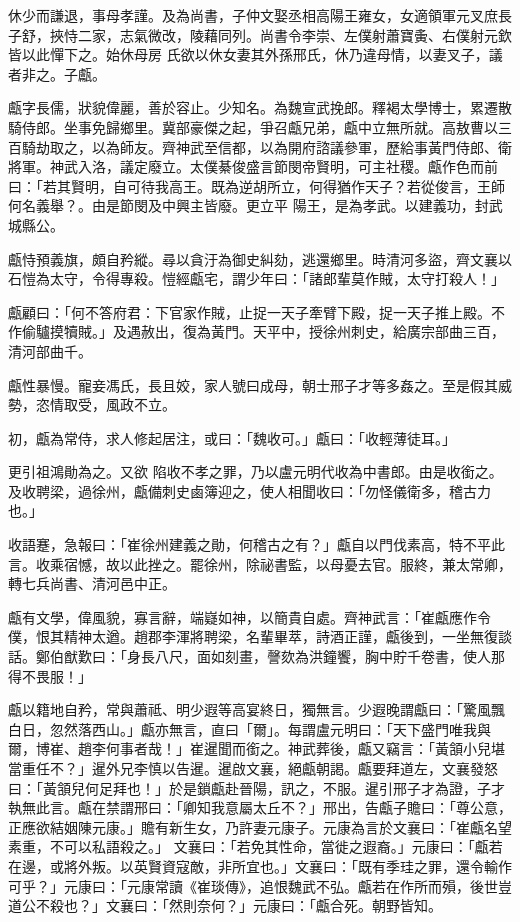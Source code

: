 \begin{pinyinscope}
 休少而謙退，事母孝謹。及為尚書，子仲文娶丞相高陽王雍女，女適領軍元叉庶長子舒，挾恃二家，志氣微改，陵藉同列。尚書令李崇、左僕射蕭寶夤、右僕射元欽皆以此憚下之。始休母房
 氏欲以休女妻其外孫邢氏，休乃違母情，以妻叉子，議者非之。子甗。



 甗字長儒，狀貌偉麗，善於容止。少知名。為魏宣武挽郎。釋褐太學博士，累遷散騎侍郎。坐事免歸鄉里。冀部豪傑之起，爭召甗兄弟，甗中立無所就。高敖曹以三百騎劫取之，以為師友。齊神武至信都，以為開府諮議參軍，歷給事黃門侍郎、衛將軍。神武入洛，議定廢立。太僕綦俊盛言節閔帝賢明，可主社稷。甗作色而前曰：「若其賢明，自可待我高王。既為逆胡所立，何得猶作天子？若從俊言，王師何名義舉？。由是節閔及中興主皆廢。更立平
 陽王，是為孝武。以建義功，封武城縣公。



 甗恃預義旗，頗自矜縱。尋以貪汙為御史糾劾，逃還鄉里。時清河多盜，齊文襄以石愷為太守，令得專殺。愷經甗宅，謂少年曰：「諸郎輩莫作賊，太守打殺人！」



 甗顧曰：「何不答府君：下官家作賊，止捉一天子牽臂下殿，捉一天子推上殿。不作偷驢摸犢賊。」及遇赦出，復為黃門。天平中，授徐州刺史，給廣宗部曲三百，清河部曲千。



 甗性暴慢。寵妾馮氏，長且姣，家人號曰成母，朝士邢子才等多姦之。至是假其威勢，恣情取受，風政不立。



 初，甗為常侍，求人修起居注，或曰：「魏收可。」甗曰：「收輕薄徒耳。」



 更引祖鴻勛為之。又欲
 陷收不孝之罪，乃以盧元明代收為中書郎。由是收銜之。及收聘梁，過徐州，甗備刺史鹵簿迎之，使人相聞收曰：「勿怪儀衛多，稽古力也。」



 收語蹇，急報曰：「崔徐州建義之勛，何稽古之有？」甗自以門伐素高，特不平此言。收乘宿憾，故以此挫之。罷徐州，除祕書監，以母憂去官。服終，兼太常卿，轉七兵尚書、清河邑中正。



 甗有文學，偉風貌，寡言辭，端嶷如神，以簡貴自處。齊神武言：「崔甗應作令僕，恨其精神太遒。趙郡李渾將聘梁，名輩畢萃，詩酒正謹，甗後到，一坐無復談話。鄭伯猷歎曰：「身長八尺，面如刻畫，謦欬為洪鐘饗，胸中貯千卷書，使人那得不畏服！」



 甗以籍地自矜，常與蕭祗、明少遐等高宴終日，獨無言。少遐晚謂甗曰：「驚風飄白日，忽然落西山。」甗亦無言，直曰「爾」。每謂盧元明曰：「天下盛門唯我與爾，博崔、趙李何事者哉！」崔暹聞而銜之。神武葬後，甗又竊言：「黃頷小兒堪當重任不？」暹外兄李慎以告暹。暹啟文襄，絕甗朝謁。甗要拜道左，文襄發怒曰：「黃頷兒何足拜也！」於是鎖甗赴晉陽，訊之，不服。暹引邢子才為證，子才執無此言。甗在禁謂邢曰：「卿知我意屬太丘不？」邢出，告甗子贍曰：「尊公意，正應欲結姻陳元康。」贍有新生女，乃許妻元康子。元康為言於文襄曰：「崔甗名望素重，不可以私語殺之。」
 文襄曰：「若免其性命，當徙之遐裔。」元康曰：「甗若在邊，或將外叛。以英賢資寇敵，非所宜也。」文襄曰：「既有季珪之罪，還令輸作可乎？」元康曰：「元康常讀《崔琰傳》，追恨魏武不弘。甗若在作所而殞，後世豈道公不殺也？」文襄曰：「然則奈何？」元康曰：「甗合死。朝野皆知。




\end{pinyinscope}
